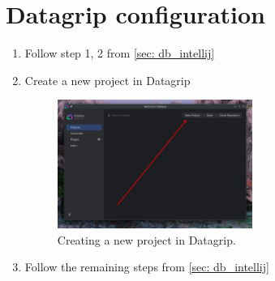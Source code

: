 \section{Datagrip configuration}

\begin{enumerate}
  \item Follow step 1, 2 from \autoref{sec: db_intellij}
  \item Create a new project in Datagrip
    \begin{figure}[H]
      \centering
      \includegraphics[width=0.6\textwidth]{img/datagrip/datagrip_1.png}
      \caption{Creating a new project in Datagrip.}
    \end{figure}

  \item Follow the remaining steps from \autoref{sec: db_intellij}
\end{enumerate}
